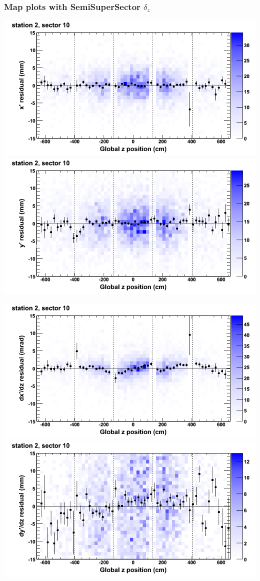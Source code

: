 \documentclass[compress]{beamer}
\begin{document}
\begin{frame}
\frametitle{Map plots with SemiSuperSector $\delta_z$}
\includegraphics[width=0.5\linewidth]{zfit_mapplots/DTvsz_st2sec10_x.png}
\includegraphics[width=0.5\linewidth]{zfit_mapplots/DTvsz_st2sec10_y.png}

\includegraphics[width=0.5\linewidth]{zfit_mapplots/DTvsz_st2sec10_dxdz.png}
\includegraphics[width=0.5\linewidth]{zfit_mapplots/DTvsz_st2sec10_dydz.png}
\end{frame}
\end{document}
